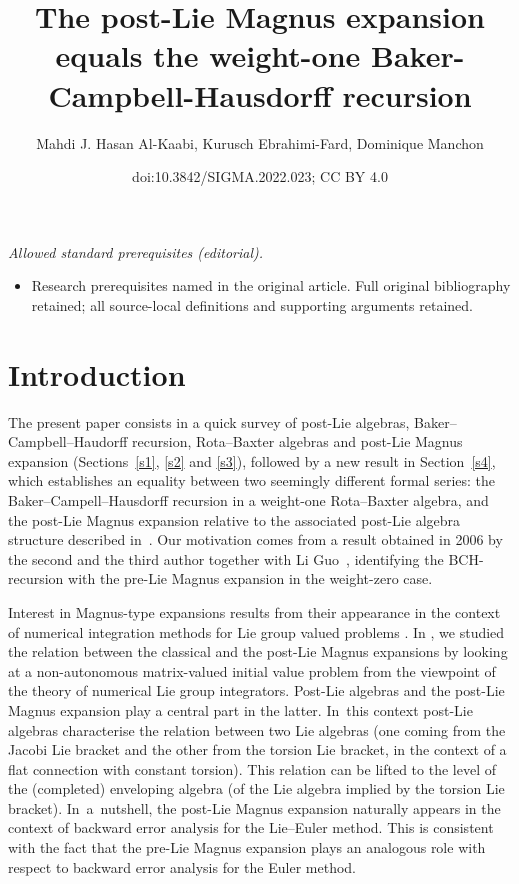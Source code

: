 \documentclass[10pt,a4paper]{amsart}
\title{The post-Lie Magnus expansion equals the weight-one Baker-Campbell-Hausdorff recursion}
\author{Mahdi J. Hasan Al-Kaabi, Kurusch Ebrahimi-Fard, Dominique Manchon}
\date{doi:10.3842/SIGMA.2022.023; CC BY 4.0}
\numberwithin{equation}{section}
\begin{document}
\maketitle
\noindent\textit{Allowed standard prerequisites (editorial).}\begin{itemize}
\item Research prerequisites named in the original article. Full original bibliography retained; all source-local definitions and supporting arguments retained.
\end{itemize}\medskip
\section{Introduction}

The present paper consists in a quick survey of post-Lie algebras, Baker--Campbell--Haudorff recursion, Rota--Baxter algebras and post-Lie Magnus expansion (Sections~\ref{s1}, \ref{s2} and \ref{s3}), followed by a new result in Section~\ref{s4}, which establishes an equality between two seemingly different formal series: the Baker--Campell--Hausdorff recursion in a weight-one Rota--Baxter algebra, and the post-Lie Magnus expansion relative to the associated post-Lie algebra structure described in~\cite{BGN10}. Our motivation comes from a result obtained in 2006 by the second and the third author together with Li Guo~\cite{KLM06}, identifying the BCH-recursion with the pre-Lie Magnus expansion in the weight-zero case.

Interest in Magnus-type expansions results from their appearance in the context of numerical integration methods for Lie group valued problems \cite{IserlesNorsett99}. In \cite{CEO20}, we studied the relation between the classical and the post-Lie Magnus expansions by looking at a non-autonomous matrix-valued initial value problem from the viewpoint of the theory of numerical Lie group integrators. Post-Lie algebras and the post-Lie Magnus expansion play a central part in the latter. In~this context post-Lie algebras characterise the relation between two Lie algebras (one coming from the Jacobi Lie bracket and the other from the torsion Lie bracket, in the context of a flat connection with constant torsion). This relation can be lifted to the level of the (completed) enveloping algebra (of the Lie algebra implied by the torsion Lie bracket). In~a~nut\-shell, the post-Lie Magnus expansion naturally appears in the context of backward error analysis for the Lie--Euler method. This is consistent with the fact that the pre-Lie Magnus expansion plays an analogous role with respect to backward error analysis for the Euler method.
\end{document}
